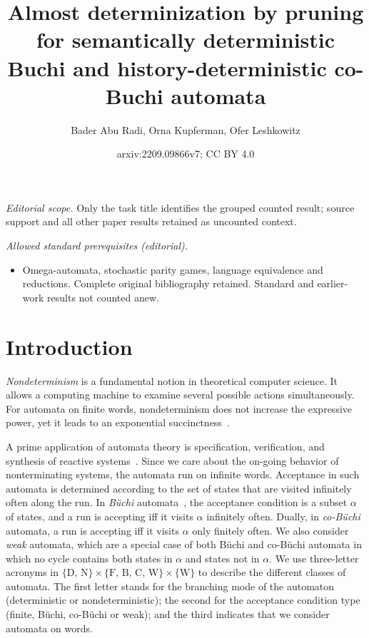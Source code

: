 \documentclass[10pt,a4paper]{amsart}
\title{Almost determinization by pruning for semantically deterministic Buchi and history-deterministic co-Buchi automata}
\author{Bader Abu Radi, Orna Kupferman, Ofer Leshkowitz}
\date{arxiv:2209.09866v7; CC BY 4.0}
\theoremstyle{definition}
\numberwithin{equation}{section}
\newcommand{\buchi}{B\"uchi\xspace}
\begin{document}
\maketitle
\noindent\textit{Editorial scope.} Only the task title identifies the grouped counted result; source support and all other paper results retained as uncounted context.\par\medskip
\noindent\textit{Allowed standard prerequisites (editorial).}\begin{itemize}
\item Omega-automata, stochastic parity games, language equivalence and reductions. Complete original bibliography retained. Standard and earlier-work results not counted anew.
\end{itemize}\medskip
\section{Introduction}
\label{intro}
{\em Nondeterminism\/} is a fundamental notion in theoretical computer science. It allows a computing machine to examine several possible actions simultaneously. 
For automata on finite words, nondeterminism does not increase the expressive power, yet it leads to an exponential succinctness~\cite{RS59}. 

A prime application of automata theory is specification, verification, and synthesis of reactive systems~\cite{VW94,Kup18}.  Since we care about the on-going behavior of nonterminating  systems, the automata run on infinite words. Acceptance in such automata is determined according to the set of states that are visited infinitely often along the run. In {\em B\"uchi\/} automata~\cite{Buc62},
the acceptance condition is a subset $\alpha$ of states, and a run is accepting iff it visits $\alpha$ infinitely often. Dually, in {\em co-B\"uchi\/} automata, 
a run is accepting iff it visits $\alpha$ only finitely often. We also consider {\em weak\/} automata, which are a special case of both \buchi and co-\buchi automata in which no cycle contains both states in $\alpha$ and states not in $\alpha$. We use three-letter acronyms in $\{ \text{D, N} \} \times \{ \text{F, B, C, W}\} \times \{\text{W}\}$ to describe the different classes of automata. The first letter stands for the branching mode of the automaton (deterministic or nondeterministic); the second for the acceptance condition type (finite, \buchi, co-\buchi or weak); and the third indicates that we consider automata on words. 
\end{document}
